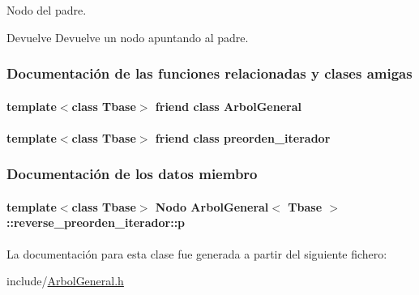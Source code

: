 Nodo del padre. 

\begin{DoxyReturn}{Devuelve}
Devuelve un nodo apuntando al padre. 
\end{DoxyReturn}


\subsubsection{Documentación de las funciones relacionadas y clases amigas}
\hypertarget{classArbolGeneral_1_1reverse__preorden__iterador_a9c06e31b7c3e0d4ee5b03003d32935a5}{
\paragraph[{Arbol\-General}]{\setlength{\rightskip}{0pt plus 5cm}template$<$class Tbase$>$ friend class {\bf Arbol\-General}\hspace{0.3cm}{\ttfamily [friend]}}}\label{classArbolGeneral_1_1reverse__preorden__iterador_a9c06e31b7c3e0d4ee5b03003d32935a5}
\hypertarget{classArbolGeneral_1_1reverse__preorden__iterador_a4aa0da8bfbc320a8daff98451ee65b6c}{
\paragraph[{preorden\-\_\-iterador}]{\setlength{\rightskip}{0pt plus 5cm}template$<$class Tbase$>$ friend class {\bf preorden\-\_\-iterador}\hspace{0.3cm}{\ttfamily [friend]}}}\label{classArbolGeneral_1_1reverse__preorden__iterador_a4aa0da8bfbc320a8daff98451ee65b6c}


\subsubsection{Documentación de los datos miembro}
\hypertarget{classArbolGeneral_1_1reverse__preorden__iterador_a002862fdee453a84b037e5dd26c071a2}{
\paragraph[{p}]{\setlength{\rightskip}{0pt plus 5cm}template$<$class Tbase$>$ {\bf Nodo} {\bf Arbol\-General}$<$ Tbase $>$\-::reverse\-\_\-preorden\-\_\-iterador\-::p\hspace{0.3cm}{\ttfamily [private]}}}\label{classArbolGeneral_1_1reverse__preorden__iterador_a002862fdee453a84b037e5dd26c071a2}


La documentación para esta clase fue generada a partir del siguiente fichero\-:\begin{DoxyCompactItemize}
\item 
include/\hyperlink{ArbolGeneral_8h}{Arbol\-General.\-h}\end{DoxyCompactItemize}
